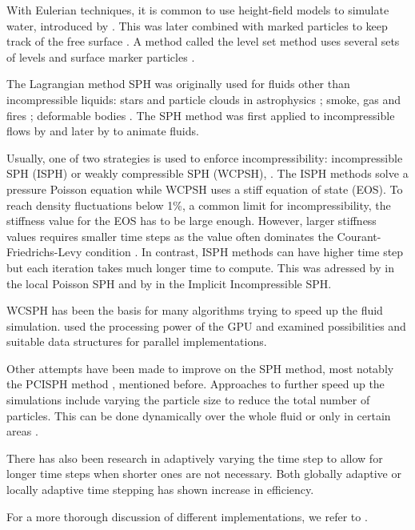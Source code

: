 \documentclass[../../main.tex]{subfiles}
\begin{document}
With Eulerian techniques, it is common to use height-field models to simulate water, introduced by \citet{kass1990rapid}. This was later combined with marked particles to keep track of the free surface \citep{foster1996realistic}. A method called the level set method uses several sets of levels and surface marker particles \citep{enright2002hybrid}. 

The Lagrangian method SPH was originally used for fluids other than incompressible liquids: stars and particle clouds in astrophysics \citep{lucy1977numerical, gingold1977smoothed}; smoke, gas and fires \citep{stam1995depicting}; deformable bodies \citep{desbrun1996smoothed}. The SPH method was first applied to incompressible flows by \citet{monaghan1994simulating} and later by \citet{muller2003particle} to animate fluids. 

Usually, one of two strategies is used to enforce incompressibility: incompressible SPH (ISPH) or weakly compressible SPH (WCPSH), \citep{becker2007weakly}. The ISPH methods solve a pressure Poisson equation while WCPSH uses a stiff equation of state (EOS). To reach density fluctuations below 1\%, a common limit for incompressibility, the stiffness value for the EOS has to be large enough. However, larger stiffness values requires smaller time steps as the value often dominates the Courant-Friedrichs-Levy condition \citep{solenthaler2009predictive}. In contrast, ISPH methods can have higher time step but each iteration takes much longer time to compute. This was adressed by \citet{he2012local} in the local Poisson SPH and by \citet{ihmsen2014implicit} in the Implicit Incompressible SPH. 

WCSPH has been the basis for many algorithms trying to speed up the fluid simulation. \citet{goswami2010interactive} used the processing power of the GPU and \citet{ihmsen2011parallel} examined possibilities and suitable data structures for parallel implementations. 

Other attempts have been made to improve on the SPH method, most notably the PCISPH method \citep{solenthaler2009predictive}, mentioned before. Approaches to further speed up the simulations include varying the particle size to reduce the total number of particles. This can be done dynamically over the whole fluid \citep{adams2007adaptively,hong2008adaptive} or only in certain areas \citep{solenthaler2011two,horvath2013mass}. 

There has also been research in adaptively varying the time step to allow for longer time steps when shorter ones are not necessary. Both globally adaptive \citep{ihmsen2010boundary,goswami2011time} or locally adaptive \citep{goswami2014regional} time stepping has shown increase in efficiency. 

For a more thorough discussion of different implementations, we refer to \citet{ihmsen2014sph}.

\end{document}

